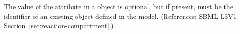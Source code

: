 The value of the attribute  in a \Reaction object is
optional, but if present, must be the identifier of an existing
\Compartment object defined in the model.  (References: SBML L3V1
Section~\ref{sec:reaction-compartment}.)
